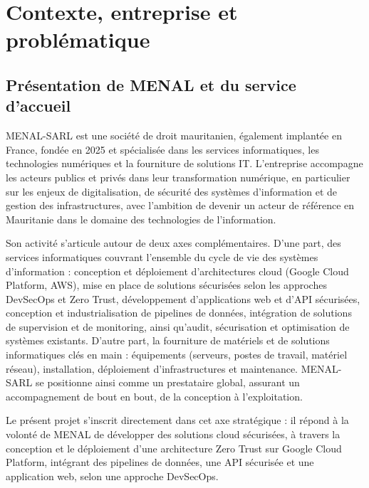 \chapter{Contexte, entreprise et problématique}
\label{ch:contexte}

\section{Présentation de MENAL et du service d'accueil}

MENAL-SARL est une société de droit mauritanien, également implantée en France, fondée en
2025 et spécialisée dans les services informatiques, les technologies numériques et la
fourniture de solutions IT. L'entreprise accompagne les acteurs publics et privés dans leur
transformation numérique, en particulier sur les enjeux de digitalisation, de sécurité des
systèmes d'information et de gestion des infrastructures, avec l'ambition de devenir un
acteur de référence en Mauritanie dans le domaine des technologies de l'information.

Son activité s'articule autour de deux axes complémentaires. D'une part, des services
informatiques couvrant l'ensemble du cycle de vie des systèmes d'information : conception
et déploiement d'architectures cloud (Google Cloud Platform, AWS), mise en place de
solutions sécurisées selon les approches DevSecOps et Zero Trust, développement
d'applications web et d'API sécurisées, conception et industrialisation de pipelines de
données, intégration de solutions de supervision et de monitoring, ainsi qu'audit,
sécurisation et optimisation de systèmes existants. D'autre part, la fourniture de
matériels et de solutions informatiques clés en main : équipements (serveurs, postes de
travail, matériel réseau), installation, déploiement d'infrastructures et maintenance.
MENAL-SARL se positionne ainsi comme un prestataire global, assurant un accompagnement de
bout en bout, de la conception à l'exploitation.

\begin{keybox}[title=Lien avec le PFE]
Le présent projet s'inscrit directement dans cet axe stratégique : il répond à la volonté
de MENAL de développer des solutions cloud sécurisées, à travers la conception et le
déploiement d'une architecture Zero Trust sur Google Cloud Platform, intégrant des
pipelines de données, une API sécurisée et une application web, selon une approche
DevSecOps.
\end{keybox}

